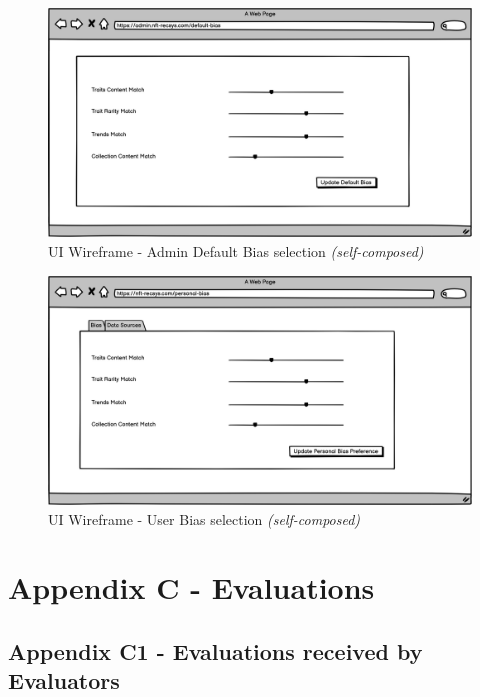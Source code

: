 \begin{figure}[h!]
\centering
\includegraphics[width=\textwidth]{images/appendix/UI Wireframes/Admin Default Bias selection.png}
\caption{UI Wireframe - Admin Default Bias selection \textit{(self-composed)}}
\end{figure}

\begin{figure}[h!]
\centering
\includegraphics[width=\textwidth]{images/appendix/UI Wireframes/User Bias selection.png}
\caption{UI Wireframe - User Bias selection \textit{(self-composed)}}
\end{figure}

\chapter{Appendix C - Evaluations}
\label{appendix:C}

\section*{Appendix C1 - Evaluations received by Evaluators}

